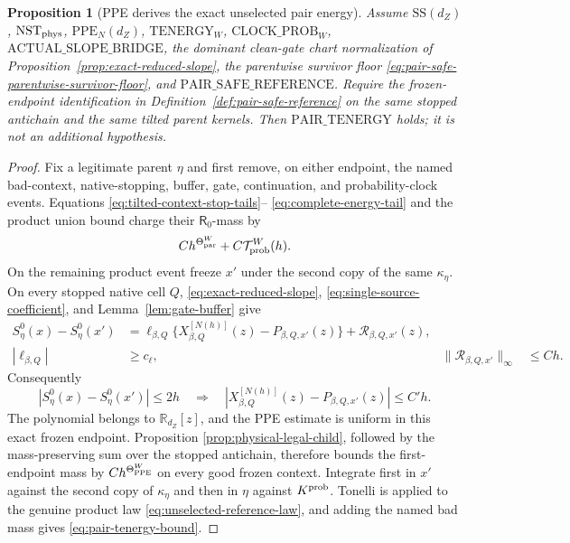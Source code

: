 \documentclass[11pt]{article}
\newtheorem{proposition}[theorem]{Proposition}
\begin{document}
\begin{proposition}[PPE derives the exact unselected pair energy]
\label{prop:ppe-implies-pair-tenergy}
Assume $\mathrm{SS}(d_Z)$, $\mathrm{NST}_{\rm phys}$,
$\mathrm{PPE}_{N}(d_Z)$, $\mathrm{TENERGY}_{W}$,
$\mathrm{CLOCK\_PROB}_{W}$, $\mathrm{ACTUAL\_SLOPE\_BRIDGE}$,
the dominant clean-gate chart normalization of
Proposition~\ref{prop:exact-reduced-slope},
the parentwise survivor floor
\eqref{eq:pair-safe-parentwise-survivor-floor}, and
$\mathrm{PAIR\_SAFE\_REFERENCE}$.  Require the frozen-endpoint
identification in Definition~\ref{def:pair-safe-reference} on the same
stopped antichain and the same tilted parent kernels.  Then
$\mathrm{PAIR\_TENERGY}$ holds; it is not an additional hypothesis.
\end{proposition}

\begin{proof}
Fix a legitimate parent $\eta$ and first remove, on either endpoint, the
named bad-context, native-stopping, buffer, gate, continuation, and
probability-clock events.  Equations
\eqref{eq:tilted-context-stop-tails}--
\eqref{eq:complete-energy-tail} and the product union bound charge their
$\mathsf R_0$-mass by
\[
 Ch^{\Theta_{\rm par}^{W}}+C\mathcal T_{\rm prob}^{W}(h).
\]
On the remaining product event freeze $x'$ under the second copy of the
same $\kappa_\eta$.  On every stopped native cell $Q$,
\eqref{eq:exact-reduced-slope},
\eqref{eq:single-source-coefficient}, and Lemma~\ref{lem:gate-buffer} give
\[
\begin{aligned}
 S_\eta^0(x)-S_\eta^0(x')
 &=\ell_{\beta,Q}
   \{X_{\beta,Q}^{[N(h)]}(z)-P_{\beta,Q,x'}(z)\}
   +\mathcal R_{\beta,Q,x'}(z),\\
 |\ell_{\beta,Q}|&\ge c_\ell,
 &\|\mathcal R_{\beta,Q,x'}\|_\infty&\le Ch.
\end{aligned}
\]
Consequently
\[
 |S_\eta^0(x)-S_\eta^0(x')|\le2h
 \quad\Longrightarrow\quad
 |X_{\beta,Q}^{[N(h)]}(z)-P_{\beta,Q,x'}(z)|\le C'h.
\]
The polynomial belongs to $\mathbb R_{d_Z}[z]$, and the PPE estimate is
uniform in this exact frozen endpoint.  Proposition
\ref{prop:physical-legal-child}, followed by the mass-preserving sum over
the stopped antichain, therefore bounds the first-endpoint mass by
$Ch^{\Theta_{\rm PPE}^{W}}$ on every good frozen context.  Integrate first
in $x'$ against the second copy of $\kappa_\eta$ and then in $\eta$ against
$K^{\rm prob}$.  Tonelli is applied to the genuine product law
\eqref{eq:unselected-reference-law}, and adding the named bad mass gives
\eqref{eq:pair-tenergy-bound}.
\end{proof}
\end{document}
